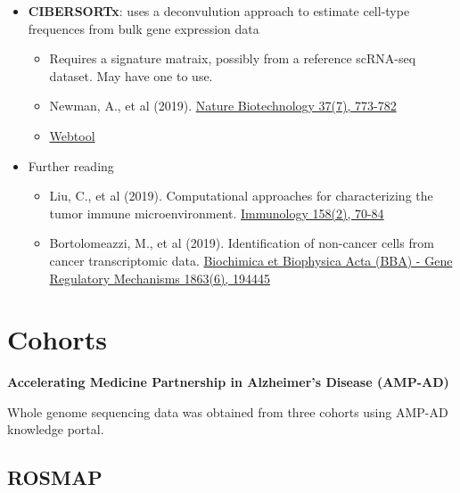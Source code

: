\documentclass[]{book}
\providecommand{\tightlist}{%
  \setlength{\itemsep}{0pt}\setlength{\parskip}{0pt}}
\begin{document}
\begin{itemize}
\tightlist
\item
  \textbf{CIBERSORTx}: uses a deconvulution approach to estimate cell-type frequences from bulk gene expression data

  \begin{itemize}
  \tightlist
  \item
    Requires a signature matraix, possibly from a reference scRNA-seq dataset. May have one to use.
  \item
    Newman, A., et al (2019). \href{https://dx.doi.org/10.1038/s41587-019-0114-2}{Nature Biotechnology 37(7), 773-782}
  \item
    \href{https://cibersortx.stanford.edu/}{Webtool}
  \end{itemize}
\item
  Further reading

  \begin{itemize}
  \tightlist
  \item
    Liu, C., et al (2019). Computational approaches for characterizing the tumor immune microenvironment. \href{https://dx.doi.org/10.1111/imm.13101}{Immunology 158(2), 70-84}
  \item
    Bortolomeazzi, M., et al (2019). Identification of non-cancer cells from cancer transcriptomic data. \href{https://dx.doi.org/10.1016/j.bbagrm.2019.194445}{Biochimica et Biophysica Acta (BBA) - Gene Regulatory Mechanisms 1863(6), 194445}
  \end{itemize}
\end{itemize}

\hypertarget{cohorts}{%
\section{Cohorts}\label{cohorts}}

\textbf{Accelerating Medicine Partnership in Alzheimer's Disease (AMP-AD)}

Whole genome sequencing data was obtained from three cohorts using AMP-AD knowledge portal.

\hypertarget{rosmap}{%
\subsection{ROSMAP}\label{rosmap}}
\end{document}
